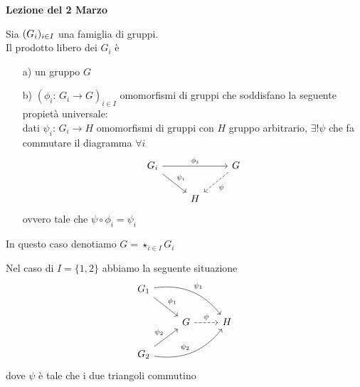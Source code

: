 

\textbf{Lezione del 2 Marzo}
\begin{defn}\bianco
Sia  $\displaystyle (G_i)_{i\in I}$ una famiglia di gruppi.\\
Il prodotto libero dei $G_i$ \`e 
\begin{itemize}
\item[a)]un gruppo $G$
\item[b)]$ \left( \phi_i:\, G_i \to G \right)_{i\in I} $ omomorfismi di gruppi che soddisfano la seguente propiet\`a universale:\\
dati $\psi_{i}:\, G_i \to H$ omomorfismi di gruppi con $H$ gruppo arbitrario, $\exists ! \psi$ che fa commutare il diagramma $\forall i$
$$ \begin{tikzcd}G_i  \arrow{rr}{\phi_i}
								   \arrow{rd}{\psi_i} & & G \arrow[dashed]{dl}{\psi}  \\
& H
\end{tikzcd}$$
ovvero tale che $\psi\circ \phi_i = \psi_i$
\end{itemize}
In questo caso denotiamo $G= \star_{i\in I} G_i$
\end{defn}
\begin{ese}Nel caso di $I=\{ 1,2\}$ abbiamo la seguente situazione 
$$\begin{tikzcd}
{}  G_1	\arrow{rd}{\phi_1}
			\arrow[bend left]{rrd}{\psi_1}&                     &    \\
                                      & G \arrow[ dashed]{r}{\psi} &H \\
G_2\arrow{ru}{\psi_2} \arrow[bend right]{rru}{\psi_2} &                     &   
\end{tikzcd}$$
dove $\psi$ \`e tale che i due triangoli commutino 
\end{ese}

